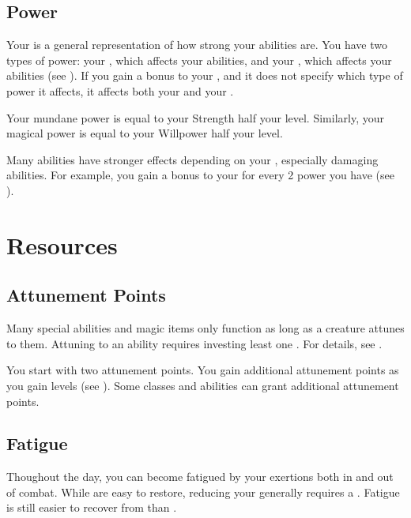   \subsection{Power}\label{Power}
    Your  is a general representation of how strong your abilities are.
    You have two types of power: your , which affects your \magical abilities, and your , which affects your  abilities (see ).
    If you gain a bonus to your , and it does not specify which type of power it affects, it affects both your  and your .

    Your mundane power is equal to your Strength \add half your level.
    Similarly, your magical power is equal to your Willpower \add half your level.

    Many abilities have stronger effects depending on your , especially damaging abilities.
    For example, you gain a  bonus to your  for every 2 power you have (see ).

\section{Resources}\label{Resources}

  \subsection{Attunement Points}\label{Attunement Points}
    Many special abilities and magic items only function as long as a creature attunes to them.
    Attuning to an ability requires investing least one .
    For details, see .

    You start with two attunement points.
    You gain additional attunement points as you gain levels (see ).
    Some classes and abilities can grant additional attunement points.

  \subsection{Fatigue}\label{Fatigue}
    Thoughout the day, you can become fatigued by your exertions both in and out of combat.
    While  are easy to restore, reducing your  generally requires a .
    Fatigue is still easier to recover from than .

